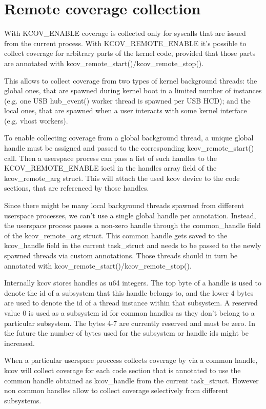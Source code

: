 \documentclass[a4paper,8pt,english]{sphinxmanual}
\begin{document}
\section{Remote coverage collection}
\label{dev-tools/kcov:remote-coverage-collection}
With KCOV\_ENABLE coverage is collected only for syscalls that are issued
from the current process. With KCOV\_REMOTE\_ENABLE it's possible to collect
coverage for arbitrary parts of the kernel code, provided that those parts
are annotated with kcov\_remote\_start()/kcov\_remote\_stop().

This allows to collect coverage from two types of kernel background
threads: the global ones, that are spawned during kernel boot in a limited
number of instances (e.g. one USB hub\_event() worker thread is spawned per
USB HCD); and the local ones, that are spawned when a user interacts with
some kernel interface (e.g. vhost workers).

To enable collecting coverage from a global background thread, a unique
global handle must be assigned and passed to the corresponding
kcov\_remote\_start() call. Then a userspace process can pass a list of such
handles to the KCOV\_REMOTE\_ENABLE ioctl in the handles array field of the
kcov\_remote\_arg struct. This will attach the used kcov device to the code
sections, that are referenced by those handles.

Since there might be many local background threads spawned from different
userspace processes, we can't use a single global handle per annotation.
Instead, the userspace process passes a non-zero handle through the
common\_handle field of the kcov\_remote\_arg struct. This common handle gets
saved to the kcov\_handle field in the current task\_struct and needs to be
passed to the newly spawned threads via custom annotations. Those threads
should in turn be annotated with kcov\_remote\_start()/kcov\_remote\_stop().

Internally kcov stores handles as u64 integers. The top byte of a handle
is used to denote the id of a subsystem that this handle belongs to, and
the lower 4 bytes are used to denote the id of a thread instance within
that subsystem. A reserved value 0 is used as a subsystem id for common
handles as they don't belong to a particular subsystem. The bytes 4-7 are
currently reserved and must be zero. In the future the number of bytes
used for the subsystem or handle ids might be increased.

When a particular userspace proccess collects coverage by via a common
handle, kcov will collect coverage for each code section that is annotated
to use the common handle obtained as kcov\_handle from the current
task\_struct. However non common handles allow to collect coverage
selectively from different subsystems.
\end{document}
